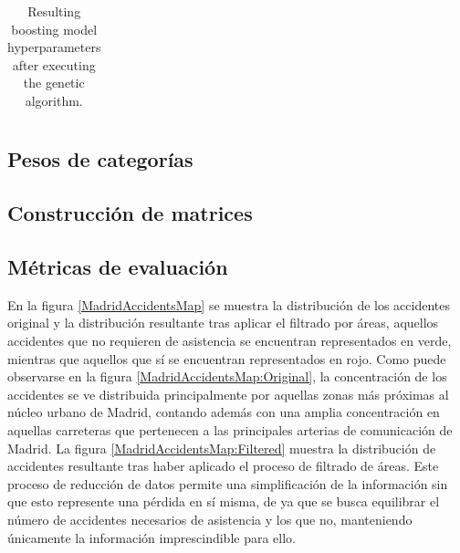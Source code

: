 \documentclass{uathesis-es}
\begin{document}
{\begin{table}[H]
\begin{center}
\begin{tabular}{|c||c|c|c|}
			\end{tabular}
		\end{center}
		\caption{Resulting boosting model hyperparameters after executing the genetic algorithm.}
		\label{ResultingHyperparamsXGBoost}
	\end{table}
	
	\subsection{Pesos de categorías}
	
	\subsection{Construcción de matrices}
	
	\subsection{Métricas de evaluación}
	
	
	
	En la figura \ref{MadridAccidentsMap} se muestra la distribución de los accidentes original y la distribución resultante tras aplicar el filtrado por áreas, aquellos accidentes que no requieren de asistencia se encuentran representados en verde, mientras que aquellos que sí se encuentran representados en rojo. Como puede observarse en la figura \ref{MadridAccidentsMap:Original}, la concentración de los accidentes se ve distribuida principalmente por aquellas zonas más próximas al núcleo urbano de Madrid, contando además con una amplia concentración en aquellas carreteras que pertenecen a las principales arterias de comunicación de Madrid. La figura  \ref{MadridAccidentsMap:Filtered} muestra la distribución de accidentes resultante tras haber aplicado el proceso de filtrado de áreas. Este proceso de reducción de datos permite una simplificación de la información sin que esto represente una pérdida en sí misma, de ya que se busca equilibrar el número de accidentes necesarios de asistencia y los que no, manteniendo únicamente la información imprescindible para ello.
	
}
\end{document}
